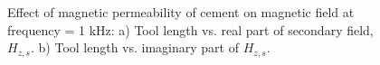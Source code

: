 \documentclass[10pt,twoside]{article}
\begin{document}
\begin{figure}[ht!]
\caption{Effect of magnetic permeability of cement on magnetic field at frequency = 1 kHz: a) Tool length vs. real part of secondary field, $H_{z,s}$. b) Tool length vs. imaginary part of $H_{z,s}$. }
\label{magfields}
\end{figure}


\begin{figure}[ht!]
\begin{minipage}{0.5\linewidth}
\end{minipage}
\hfill
\begin{minipage}{0.5\linewidth}

\end{minipage}
\end{figure}
\end{document}
